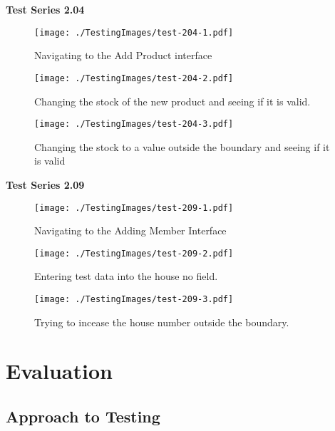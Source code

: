 \pagebreak

\textbf{Test Series 2.04}

\begin{figure}[H]
    \texttt{[image: ./TestingImages/test-204-1.pdf]}
    \caption{Navigating to the Add Product interface}  \label{fig:test-204-1}
\end{figure}

\begin{figure}[H]
    \texttt{[image: ./TestingImages/test-204-2.pdf]}
    \caption{Changing the stock of the new product and seeing if it is valid.}  \label{fig:test-204-2}
\end{figure}

\begin{figure}[H]
    \texttt{[image: ./TestingImages/test-204-3.pdf]}
    \caption{Changing the stock to a value outside the boundary and seeing if it is valid}  \label{fig:test-204-3}
\end{figure}

\pagebreak

\textbf{Test Series 2.09}

\begin{figure}[H]
    \texttt{[image: ./TestingImages/test-209-1.pdf]}
    \caption{Navigating to the Adding Member Interface}  \label{fig:test-209-1}
\end{figure}

\begin{figure}[H]
    \texttt{[image: ./TestingImages/test-209-2.pdf]}
    \caption{Entering test data into the house no field.}  \label{fig:test-209-2}
\end{figure}

\begin{figure}[H]
    \texttt{[image: ./TestingImages/test-209-3.pdf]}
    \caption{Trying to incease the house number outside the boundary.}  \label{fig:test-209-3}
\end{figure}


\section{Evaluation}

\subsection{Approach to Testing}

